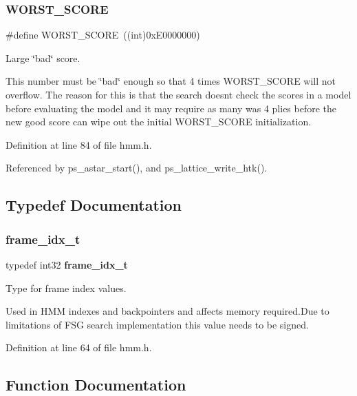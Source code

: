\subsubsection{W\+O\+R\+S\+T\+\_\+\+S\+C\+O\+RE}
{\footnotesize\ttfamily \#define W\+O\+R\+S\+T\+\_\+\+S\+C\+O\+RE~((int)0x\+E0000000)}



Large \char`\"{}bad\char`\"{} score. 

This number must be \char`\"{}bad\char`\"{} enough so that 4 times W\+O\+R\+S\+T\+\_\+\+S\+C\+O\+RE will not overflow. The reason for this is that the search doesn\textquotesingle{}t check the scores in a model before evaluating the model and it may require as many was 4 plies before the new \textquotesingle{}good\textquotesingle{} score can wipe out the initial W\+O\+R\+S\+T\+\_\+\+S\+C\+O\+RE initialization. 

Definition at line 84 of file hmm.\+h.



Referenced by ps\+\_\+astar\+\_\+start(), and ps\+\_\+lattice\+\_\+write\+\_\+htk().



\subsection{Typedef Documentation}
\mbox{\label{hmm_8h_ac9c9bae34d05f32736ae1743316737ef}} 
\subsubsection{frame\+\_\+idx\+\_\+t}
{\footnotesize\ttfamily typedef int32 \textbf{ frame\+\_\+idx\+\_\+t}}



Type for frame index values. 

Used in H\+MM indexes and backpointers and affects memory required.\+Due to limitations of F\+SG search implementation this value needs to be signed. 

Definition at line 64 of file hmm.\+h.



\subsection{Function Documentation}
\mbox{\label{hmm_8h_af4c0cefb23087a0b1731b34048cfdaf9}} 
